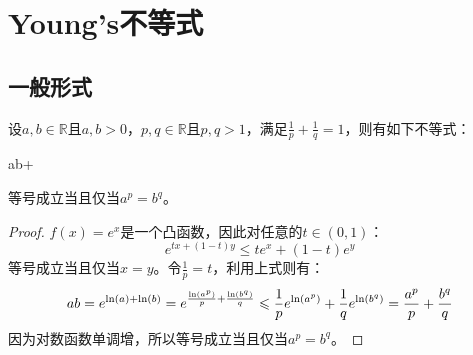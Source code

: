 \section{Young's不等式}

\subsection{一般形式}
\begin{theorem}
	设$a,b\in\mathbb{R}$且$a,b>0$，$p,q\in\mathbb{R}$且$p,q>1$，满足$\frac{1}{p}+\frac{1}{q}=1$，则有如下不等式：
	\begin{inequality*}\label{ineq:young-ineq-Simple}
		ab\leqslant{}+
	\end{inequality*}
	等号成立当且仅当$a^p=b^q$。
\end{theorem}
\begin{proof}
	$f(x)=e^x$是一个凸函数，因此对任意的$t\in(0,1)$：
	\begin{equation*}
		e^{tx+(1-t)y}\leqslant te^x+(1-t)e^y
	\end{equation*}
	等号成立当且仅当$x=y$。令$\frac{1}{p}=t$，利用上式则有：
	\begin{equation*}
		ab=e^{\ln(a)+\ln(b)}=e^{\frac{\ln(a^p)}{p}+\frac{\ln(b^q)}{q}}\leqslant\frac{1}{p}e^{\ln(a^p)}+\frac{1}{q}e^{\ln(b^q)}=\frac{a^p}{p}+\frac{b^q}{q}\qedhere
	\end{equation*}
	因为对数函数单调增，所以等号成立当且仅当$a^p=b^q$。
\end{proof}